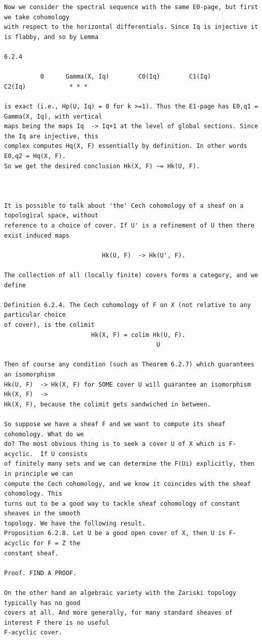 \begin{Verbatim}[fontsize=\footnotesize]
Now we consider the spectral sequence with the same E0-page, but first we take cohomology
with respect to the horizontal differentials. Since Iq is injective it is flabby, and so by Lemma

6.2.4

          0      Gamma(X, Iq)        C0(Iq)        C1(Iq)        C2(Iq)            * * *

is exact (i.e., Hp(U, Iq) = 0 for k >=1). Thus the E1-page has E0,q1 = Gamma(X, Iq), with vertical
maps being the maps Iq  -> Iq+1 at the level of global sections. Since the Iq are injective, this
complex computes Hq(X, F) essentially by definition. In other words E0,q2 = Hq(X, F).
So we get the desired conclusion Hk(X, F) ~= Hk(U, F).



It is possible to talk about 'the' Cech cohomology of a sheaf on a topological space, without
reference to a choice of cover. If U' is a refinement of U then there exist induced maps

                           Hk(U, F)  -> Hk(U', F).

The collection of all (locally finite) covers forms a category, and we define

Definition 6.2.4. The Cech cohomology of F on X (not relative to any particular choice
of cover), is the colimit
                        Hk(X, F) = colim Hk(U, F).
                                          U

Then of course any condition (such as Theorem 6.2.7) which guarantees an isomorphism
Hk(U, F)  -> Hk(X, F) for SOME cover U will guarantee an isomorphism Hk(X, F)  -> 
Hk(X, F), because the colimit gets sandwiched in between.

So suppose we have a sheaf F and we want to compute its sheaf cohomology. What do we
do? The most obvious thing is to seek a cover U of X which is F-acyclic.  If U consists
of finitely many sets and we can determine the F(Ui) explicitly, then in principle we can
compute the Cech cohomology, and we know it coincides with the sheaf cohomology. This
turns out to be a good way to tackle sheaf cohomology of constant sheaves in the smooth
topology. We have the following result.
Proposition 6.2.8. Let U be a good open cover of X, then U is F-acyclic for F = Z the
constant sheaf.

Proof. FIND A PROOF.

On the other hand an algebraic variety with the Zariski topology typically has no good
covers at all. And more generally, for many standard sheaves of interest F there is no useful
F-acyclic cover.


\end{Verbatim}
